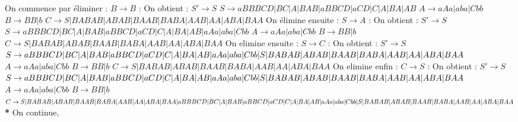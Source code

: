 \documentclass{article}
\begin{document}
\newline On commence par éliminer : $B \rightarrow B$ : On obtient : 
\newline $S' \rightarrow S$
\newline $S \rightarrow aBBBCD|BC|A|BAB|aBBCD|aCD|C|A|BA|AB$
\newline $A \rightarrow aAa|aba|Cbb$
\newline $B \rightarrow BB|b$
\newline $C \rightarrow S|BABAB|ABAB|BAAB|BABA|AAB|AA|ABA|BAA$
\newline 
\newline On élimine ensuite  : $S \rightarrow A$ : On obtient : 
\newline $S' \rightarrow S$
\newline $S \rightarrow aBBBCD|BC|A|BAB|aBBCD|aCD|C|A|BA|AB|aAa|aba|Cbb$
\newline $A \rightarrow aAa|aba|Cbb$
\newline $B \rightarrow BB|b$
\newline $C \rightarrow S|BABAB|ABAB|BAAB|BABA|AAB|AA|ABA|BAA$
\newline 
\newline 
On elimine ensuite : $S \rightarrow C$ : On obtient : 
\newline $S' \rightarrow S$
\newline $S \rightarrow aBBBCD|BC|A|BAB|aBBCD|aCD|C|A|BA|AB|aAa|aba|Cbb|S|BABAB|ABAB|BAAB|\newline BABA|AAB|AA|ABA|BAA$
\newline $A \rightarrow aAa|aba|Cbb$
\newline $B \rightarrow BB|b$
\newline $C \rightarrow S|BABAB|ABAB|BAAB|BABA|AAB|AA|ABA|BAA$
\newline 
On elimine enfin : $C \rightarrow S$ : On obtient : 
\newline $S' \rightarrow S$
\newline $S \rightarrow aBBBCD|BC|A|BAB|aBBCD|aCD|C|A|BA|AB|aAa|aba|Cbb|S|BABAB|ABAB|BAAB|\newline BABA|AAB|AA|ABA|BAA$
\newline $A \rightarrow aAa|aba|Cbb$
\newline $B \rightarrow BB|b$
\newline $C \rightarrow S|BABAB|ABAB|BAAB|BABA|AAB|AA|ABA|BAA|\newline aBBBCD|BC|A|BAB|aBBCD|aCD|C|A|BA|AB|aAa|aba|Cbb|\newline S|BABAB|ABAB|BAAB|BABA|AAB|AA|ABA|BAA$
\newline
\newline \textbf{*} On continue, 
\\
\\
\\
\\
\\
\\
\end{document}
